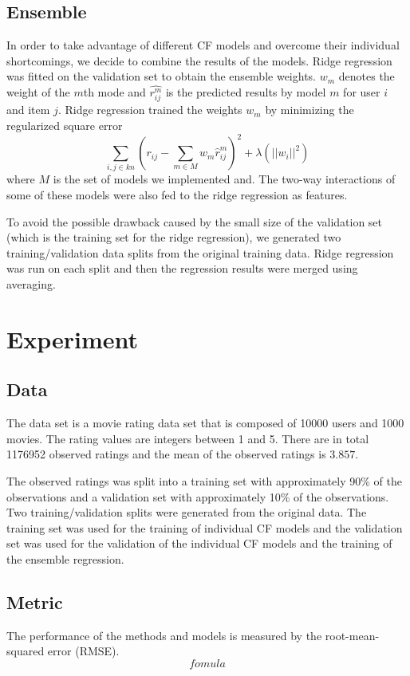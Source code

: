 \documentclass[10pt,conference,compsocconf]{IEEEtran}
\begin{document}
\subsection{Ensemble}
In order to take advantage of different CF models and overcome their individual shortcomings, we decide to combine the results of the models. Ridge regression was fitted on the validation set to obtain the ensemble weights. $w_m$ denotes the weight of the $m$th mode and $\hat{r_{ij}^m}$ is the predicted results by model $m$ for user $i$ and item $j$. Ridge regression trained the weights $w_m$ by minimizing the regularized square error
$$  \sum_{i, j\in kn} (r_{ij} - \sum_{m\in M}w_m\hat r_{ij}^m)^2 + \lambda (||w_i||^2)  $$
where $M$ is the set of models we implemented and. The two-way interactions of some of these models were also fed to the ridge regression as features.

To avoid the possible drawback caused by the small size of the validation set (which is the training set for the ridge regression), we generated two training/validation data splits from the original training data. Ridge regression was run on each split and then the regression results were merged using averaging.

\section{Experiment}
\subsection{Data}
 The data set is a movie rating data set that is composed of 10000 users and 1000 movies. The rating values are integers between 1 and 5. There are in total 1176952 observed ratings and the mean of the observed ratings is $3.857$.

 The observed ratings was split into a training set with approximately 90\% of the observations and a validation set with approximately 10\% of the observations. Two training/validation splits were generated from the original data. The training set was used for the training of individual CF models and the validation set was used for the validation of the individual CF models and the training of the ensemble regression.

\subsection{Metric}
The performance of the methods and models is measured by the root-mean-squared error (RMSE).
$$fomula$$
\end{document}
